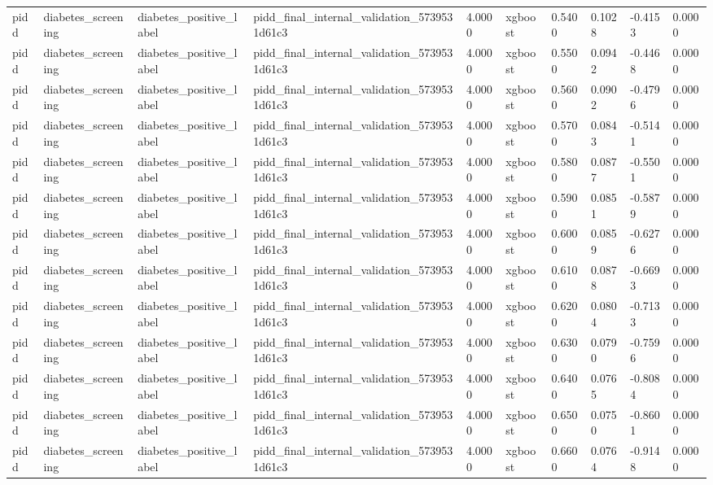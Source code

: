 \begin{tabular}{llllllllll}
pidd & diabetes\_screening & diabetes\_positive\_label & pidd\_final\_internal\_validation\_5739531d61c3 & 4.0000 & xgboost & 0.5400 & 0.1028 & -0.4153 & 0.0000 \\
pidd & diabetes\_screening & diabetes\_positive\_label & pidd\_final\_internal\_validation\_5739531d61c3 & 4.0000 & xgboost & 0.5500 & 0.0942 & -0.4468 & 0.0000 \\
pidd & diabetes\_screening & diabetes\_positive\_label & pidd\_final\_internal\_validation\_5739531d61c3 & 4.0000 & xgboost & 0.5600 & 0.0902 & -0.4796 & 0.0000 \\
pidd & diabetes\_screening & diabetes\_positive\_label & pidd\_final\_internal\_validation\_5739531d61c3 & 4.0000 & xgboost & 0.5700 & 0.0843 & -0.5141 & 0.0000 \\
pidd & diabetes\_screening & diabetes\_positive\_label & pidd\_final\_internal\_validation\_5739531d61c3 & 4.0000 & xgboost & 0.5800 & 0.0877 & -0.5501 & 0.0000 \\
pidd & diabetes\_screening & diabetes\_positive\_label & pidd\_final\_internal\_validation\_5739531d61c3 & 4.0000 & xgboost & 0.5900 & 0.0851 & -0.5879 & 0.0000 \\
pidd & diabetes\_screening & diabetes\_positive\_label & pidd\_final\_internal\_validation\_5739531d61c3 & 4.0000 & xgboost & 0.6000 & 0.0859 & -0.6276 & 0.0000 \\
pidd & diabetes\_screening & diabetes\_positive\_label & pidd\_final\_internal\_validation\_5739531d61c3 & 4.0000 & xgboost & 0.6100 & 0.0878 & -0.6693 & 0.0000 \\
pidd & diabetes\_screening & diabetes\_positive\_label & pidd\_final\_internal\_validation\_5739531d61c3 & 4.0000 & xgboost & 0.6200 & 0.0804 & -0.7133 & 0.0000 \\
pidd & diabetes\_screening & diabetes\_positive\_label & pidd\_final\_internal\_validation\_5739531d61c3 & 4.0000 & xgboost & 0.6300 & 0.0790 & -0.7596 & 0.0000 \\
pidd & diabetes\_screening & diabetes\_positive\_label & pidd\_final\_internal\_validation\_5739531d61c3 & 4.0000 & xgboost & 0.6400 & 0.0765 & -0.8084 & 0.0000 \\
pidd & diabetes\_screening & diabetes\_positive\_label & pidd\_final\_internal\_validation\_5739531d61c3 & 4.0000 & xgboost & 0.6500 & 0.0750 & -0.8601 & 0.0000 \\
pidd & diabetes\_screening & diabetes\_positive\_label & pidd\_final\_internal\_validation\_5739531d61c3 & 4.0000 & xgboost & 0.6600 & 0.0764 & -0.9148 & 0.0000 \\

\end{tabular}
